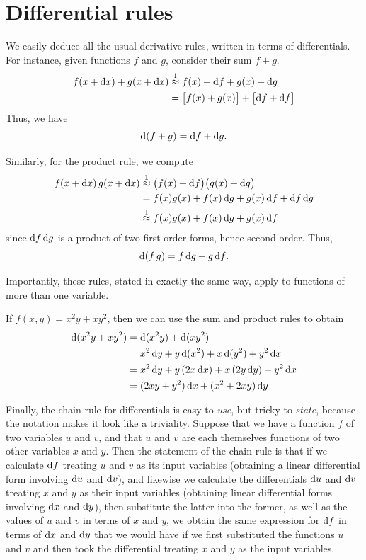\documentclass[12pt]{amsart}
\begin{document}
\section{Differential rules}
\label{sec:differential-rules}

We easily deduce all the usual derivative rules, written in terms of differentials.
For instance, given functions $f$ and $g$, consider their sum $f+g$.
\begin{align*}
  f(x+{\mathrm{d} x}) + g(x+{\mathrm{d} x})
  &\mathrel{\overset{1}{\approx}} f(x) + {\mathrm{d} f} + g(x) + {\mathrm{d} g}\\
  &= \big[f(x) + g(x)\big] + \big[ {\mathrm{d} f} + {\mathrm{d} f} \big]
\end{align*}
Thus, we have
\[ \mathrm{d}(f+g) = {\mathrm{d} f} + {\mathrm{d} g}. \]

Similarly, for the product rule, we compute
\begin{align*}
  f(x+{\mathrm{d} x}) \, g(x+{\mathrm{d} x})
  &\mathrel{\overset{1}{\approx}} \big(f(x)+{\mathrm{d} f}\big)\big(g(x) + {\mathrm{d} g} \big)\\
  &= f(x) g(x) + f(x) \,{\mathrm{d} g} + g(x) \,{\mathrm{d} f} + {\mathrm{d} f}\,{\mathrm{d} g}\\
  &\mathrel{\overset{1}{\approx}} f(x) g(x) + f(x) \,{\mathrm{d} g} + g(x) \,{\mathrm{d} f}
\end{align*}
since ${\mathrm{d} f}\,{\mathrm{d} g}$ is a product of two first-order forms, hence second order.
Thus,
\[ \mathrm{d}(f\,g) = f\,{\mathrm{d} g} + g\,{\mathrm{d} f}.\]

Importantly, these rules, stated in exactly the same way, apply to functions of more than one variable.
\begin{eg}\label{eg:twovar-differential}
  If $f(x,y) = x^2y + xy^2$, then we can use the sum and product rules to obtain
  \begin{align*}
    \mathrm{d}(x^2y + xy^2) &= \mathrm{d}(x^2y) + \mathrm{d}(xy^2)\\
    &= x^2\,{\mathrm{d} y} + y \,\mathrm{d}(x^2) + x \,\mathrm{d}(y^2) + y^2\,{\mathrm{d} x}\\
    &= x^2\,{\mathrm{d} y} + y \,(2x\,{\mathrm{d} x}) + x\, (2y\,{\mathrm{d} y}) + y^2\,{\mathrm{d} x}\\
    &= (2xy + y^2)\,{\mathrm{d} x} + (x^2+2xy)\,{\mathrm{d} y}
  \end{align*}
\end{eg}

Finally, the chain rule for differentials is easy to \emph{use}, but tricky to \emph{state}, because the notation makes it look like a triviality.
Suppose that we have a function $f$ of two variables $u$ and $v$, and that $u$ and $v$ are each themselves functions of two other variables $x$ and $y$.
Then the statement of the chain rule is that if we calculate ${\mathrm{d} f}$ treating $u$ and $v$ as its input variables (obtaining a linear differential form involving ${\mathrm{d} u}$ and ${\mathrm{d} v}$), and likewise we calculate the differentials ${\mathrm{d} u}$ and ${\mathrm{d} v}$ treating $x$ and $y$ as their input variables (obtaining linear differential forms involving ${\mathrm{d} x}$ and ${\mathrm{d} y}$), then substitute the latter into the former, as well as the values of $u$ and $v$ in terms of $x$ and $y$, we obtain the same expression for ${\mathrm{d} f}$ in terms of ${\mathrm{d} x}$ and ${\mathrm{d} y}$ that we would have if we first substituted the functions $u$ and $v$ and then took the differential treating $x$ and $y$ as the input variables.
\end{document}
